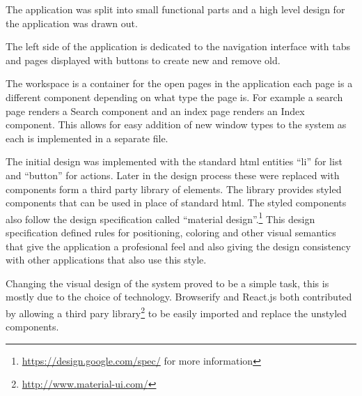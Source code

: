 The application was split into small functional parts and a high level
design for the application was drawn out.


The left side of the application is dedicated to the navigation
interface with tabs and pages displayed with buttons to create new and
remove old.

The workspace is a container for the open pages in the application each
page is a different component depending on what type the page is. For
example a search page renders a Search component and an index page
renders an Index component. This allows for easy addition of new window
types to the system as each is implemented in a separate file.

The initial design was implemented with the standard html entities ``li''
for list and ``button'' for actions. Later in the design process these
were replaced with components form a third party library of elements. The library
provides styled components that can be used in place of standard html. 
The styled components also follow the design specification called
``material design''.\footnote{\url{https://design.google.com/spec/} for more
information} This design specification defined rules for positioning, coloring
and other visual semantics that give the application a profesional feel and 
also giving the design consistency with other applications that also use 
this style.

Changing the visual design of the system proved to be a simple task, this is
mostly due to the choice of technology. Browserify and React.js both contributed
by allowing a third pary library\footnote{\url{http://www.material-ui.com/}} to 
be easily imported and replace the unstyled components.
